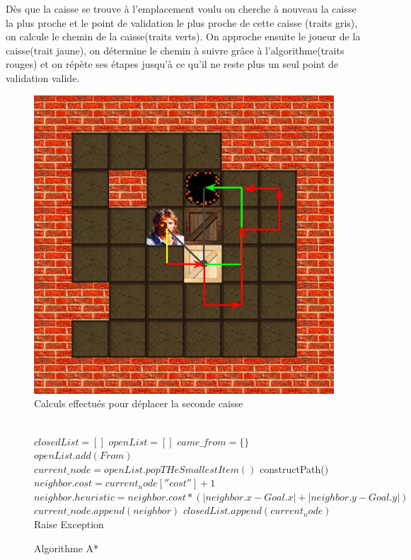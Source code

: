 \documentclass[a4paper,12pt]{article}
\begin{document}
Dès que la caisse se trouve à l’emplacement voulu on cherche à nouveau la caisse la plus proche et le point de validation le plus proche de cette caisse (traits gris), on calcule le chemin de la caisse(traits verts). On approche ensuite le joueur de la caisse(trait jaune), on détermine le chemin à suivre grâce à l'algorithme(traits rouges) et on répète ses étapes jusqu'à ce qu'il ne reste plus un seul point de validation valide.

\begin{figure}[H]
\begin{center}
\includegraphics[width=0.6\linewidth]{./Illustrations/solver2.jpg}
\caption{Calculs effectués pour déplacer la seconde caisse}
\end{center}
\end{figure}

\begin{figure}[H]
\begin{algorithmic}
\\
\State $closedList = []$
\State $openList = []$ 
\State $came\_from = \{\}$
\State $openList.add(From)$
	\State $current\_node = openList.popTHeSmallestItem()$
		\State \Return constructPath()
	\EndIf
			\State $neighbor.cost = current_node[''cost''] + 1$
			\State $neighbor.heuristic = neighbor.cost * (|neighbor.x - Goal.x| + |neighbor.y - Goal.y|)$
			\State $current\_node.append(neighbor)$
		\EndIf
	\EndFor
	\State  $closedList.append(current_node)$
\EndWhile
\State Raise Exception
\EndFunction
\end{algorithmic}
\caption{Algorithme A*}
\end{figure}
\end{document}
